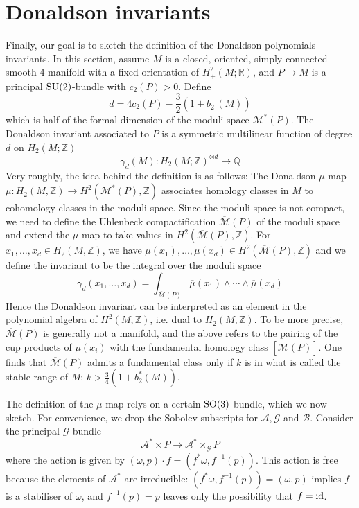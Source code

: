 \section{Donaldson invariants}
Finally, our goal is to sketch the definition of the Donaldson polynomials
invariants. 
In this section, assume $M$ is a closed,
oriented, simply connected smooth 4-manifold with a fixed orientation of
$H^2_+(M;\mathbb{R})$, and 
$P\to M$ is a principal $\operatorname{SU}(2)$-bundle with  $c_2(P) > 0$. Define 
\[
d = 4c_2(P) - \frac{3}{2}(1+b_2^+(M))
\] 
which is half of the formal dimension of the moduli space
$\mathcal{M}^*(P)$. The Donaldson invariant associated to $P$ is a
symmetric multilinear function of degree  $d$ on $H_2(M;\mathbb{Z})$ 
\[
\gamma_d(M) : H_2(M;\mathbb{Z})^{\otimes d} \to \mathbb{Q}
\] 
Very roughly, the idea behind the definition is as follows: The Donaldson $\mu$ 
map $\mu: H_2(M,\mathbb{Z}) \to H^2(\mathcal{M}^*(P),\mathbb{Z})$ associates
homology classes in $M$ to cohomology classes in the moduli space. 
Since the moduli space is not compact, we need to define the Uhlenbeck 
compactification $\overline{\mathcal{M}}(P)$ of the
moduli space and extend the $\mu$ map to take values in
$H^2(\overline{\mathcal{M}}(P),\mathbb{Z})$.
For $x_1,\ldots,x_d \in H_2(M,\mathbb{Z})$, we have $\mu(x_1),\ldots,\mu(x_d)\in
H^2(\overline{\mathcal{M}}(P),\mathbb{Z})$ and we define the invariant to be the integral
over the moduli space
 \[
\gamma_d(x_1,\ldots,x_d) 
= \int_{\overline{\mathcal{M}}(P)} \overline{\mu}(x_1)\wedge \cdots\wedge
\overline{\mu}(x_d)
\] 
Hence the Donaldson invariant can be interpreted as 
an element in the polynomial algebra of $H^2(M,\mathbb{Z})$, i.e. dual to
$H_2(M,\mathbb{Z})$.  
To be more precise, $\overline{\mathcal{M}}(P)$ is generally not a manifold, and the above
refers to the pairing of the cup products of $\mathcal{\mu}(x_i)$ with the fundamental 
homology class $[\overline{\mathcal{M}}(P)]$. One finds that
$\overline{\mathcal{M}}(P)$ admits a fundamental class only if $k$ is in what is 
called the stable range of $M$:  $k > \frac{3}{4}(1+b_2^*(M))$.

The definition of the $\mu$ map relys on a certain $\operatorname{SO}(3)$-bundle, which we now
sketch. For convenience, we drop the Sobolev subscripts for
$\mathcal{A},\mathcal{G}$ and $\mathcal{B}$. 
Consider the principal $\mathcal{G}$-bundle
\[
\mathcal{A}^* \times P  \to \mathcal{A}^* \times_\mathcal{G} P 
\]
where the action is given by $(\omega,p)\cdot f = (f^*\omega, f^{-1}(p))$.
This action is free because the elements of $\mathcal{A}^*$ are irreducible:
$(f^*\omega,f^{-1}(p)) = (\omega,p)$ implies $f$ is a stabiliser of  $\omega$,
and  $f^{-1}(p)=p$ leaves only the possibility that $f=\operatorname{id}$.

